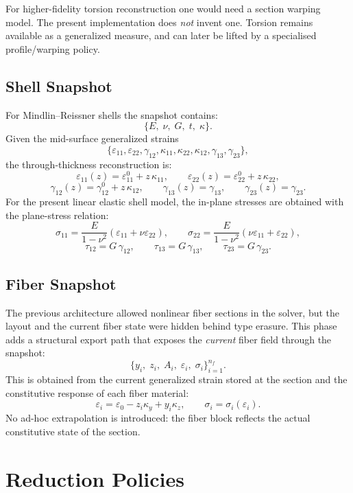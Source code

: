 For higher-fidelity torsion reconstruction one would need a section warping
model.  The present implementation does \emph{not} invent one.  Torsion
remains available as a generalized measure, and can later be lifted by a
specialised profile/warping policy.

\subsection{Shell Snapshot}

For Mindlin--Reissner shells the snapshot contains:
\[
\{E,\; \nu,\; G,\; t,\; \kappa\}.
\]
Given the mid-surface generalized strains
\[
\{\varepsilon_{11}, \varepsilon_{22}, \gamma_{12},
  \kappa_{11}, \kappa_{22}, \kappa_{12},
  \gamma_{13}, \gamma_{23}\},
\]
the through-thickness reconstruction is:
\[
\varepsilon_{11}(z) = \varepsilon_{11}^0 + z\,\kappa_{11}, \qquad
\varepsilon_{22}(z) = \varepsilon_{22}^0 + z\,\kappa_{22},
\]
\[
\gamma_{12}(z) = \gamma_{12}^0 + z\,\kappa_{12}, \qquad
\gamma_{13}(z) = \gamma_{13}, \qquad
\gamma_{23}(z) = \gamma_{23}.
\]
For the present linear elastic shell model, the in-plane stresses are obtained
with the plane-stress relation:
\[
\sigma_{11} = \frac{E}{1-\nu^2}\left(\varepsilon_{11} + \nu\varepsilon_{22}\right),
\qquad
\sigma_{22} = \frac{E}{1-\nu^2}\left(\nu\varepsilon_{11} + \varepsilon_{22}\right),
\]
\[
\tau_{12} = G\,\gamma_{12}, \qquad
\tau_{13} = G\,\gamma_{13}, \qquad
\tau_{23} = G\,\gamma_{23}.
\]

\subsection{Fiber Snapshot}

The previous architecture allowed nonlinear fiber sections in the solver, but
the layout and the current fiber state were hidden behind type erasure.  This
phase adds a structural export path that exposes the \emph{current} fiber field
through the snapshot:
\[
\{y_i,\; z_i,\; A_i,\; \varepsilon_i,\; \sigma_i\}_{i=1}^{n_f}.
\]
This is obtained from the current generalized strain stored at the section and
the constitutive response of each fiber material:
\[
\varepsilon_i = \varepsilon_0 - z_i\kappa_y + y_i\kappa_z,
\qquad
\sigma_i = \sigma_i(\varepsilon_i).
\]
No ad-hoc extrapolation is introduced: the fiber block reflects the actual
constitutive state of the section.

\section{Reduction Policies}

